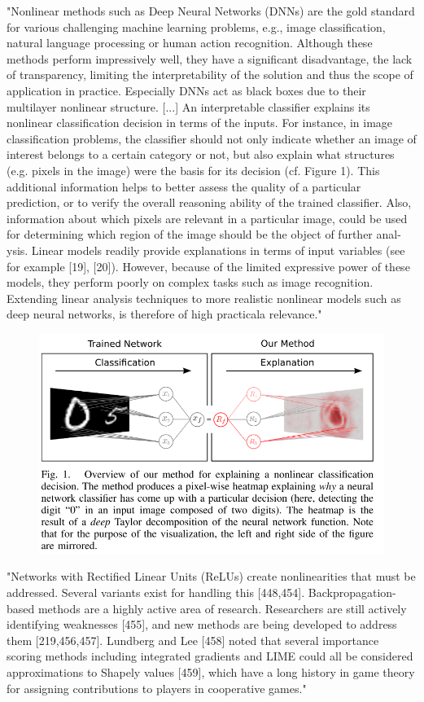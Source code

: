\documentclass[]{scrartcl}
\begin{document}
"Nonlinear methods such as Deep Neural Networks (DNNs) are the gold standard for various challenging machine learning problems, e.g., image classification, natural language processing or human action recognition. Although these methods perform impressively well, they have a significant disadvantage, the lack of transparency, limiting the interpretability of the solution and thus the scope of application in practice. Especially DNNs act as black boxes due to their multilayer nonlinear structure.
[...]
An interpretable classifier explains its nonlinear classification decision in terms of the inputs. For instance, in image classification problems, the classifier should not only indicate whether an image of interest belongs to a certain category or not, but also explain what structures (e.g. pixels in the image) were the basis for its decision (cf. Figure 1). This additional information helps to better assess the quality of a particular prediction, or to verify the overall reasoning ability of the trained classifier. Also, information about which pixels are relevant in a particular image, could be used for determining which region of the image should be the object of further anal- ysis. Linear models readily provide explanations in terms of input variables (see for example [19], [20]). However, because of the limited expressive power of these models, they perform poorly on complex tasks such as image recognition. Extending linear analysis techniques to more realistic nonlinear models such as deep neural networks, is therefore of high practicala relevance." \cite{Montavon2017}
\begin{figure}
\centering
\includegraphics[width=0.7\linewidth]{deeptaylor}\\
\end{figure}

"Networks with Rectified Linear Units (ReLUs) create nonlinearities that must be addressed. Several variants exist for handling this [448,454]. Backpropagation-based methods are a highly active area of research. Researchers are still actively identifying weaknesses [455], and new methods are being developed to address them [219,456,457]. Lundberg and Lee [458] noted that several importance scoring methods including integrated gradients and LIME could all be considered approximations to Shapely values [459], which have a long history in game theory for assigning contributions to players in cooperative games." \cite{Ching2017}
\end{document}
